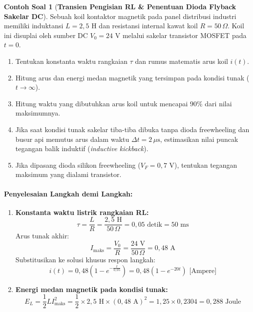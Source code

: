 \documentclass[11pt,a4paper]{article}
\theoremstyle{definition}
\newtheorem{example}{Contoh Soal}[section]
\begin{document}
\begin{example}[\textbf{Transien Pengisian RL \& Penentuan Dioda Flyback Sakelar DC}]
Sebuah koil kontaktor magnetik pada panel distribusi industri memiliki induktansi $L = 2{,}5\text{ H}$ dan resistansi internal kawat koil $R = 50\,\Omega$. Koil ini disuplai oleh sumber DC $V_0 = 24\text{ V}$ melalui sakelar transistor MOSFET pada $t = 0$.
\begin{enumerate}[label=(\alph*)]
    \item Tentukan konstanta waktu rangkaian $\tau$ dan rumus matematis arus koil $i(t)$.
    \item Hitung arus dan energi medan magnetik yang tersimpan pada kondisi tunak ($t \to \infty$).
    \item Hitung waktu yang dibutuhkan arus koil untuk mencapai $90\%$ dari nilai maksimumnya.
    \item Jika saat kondisi tunak sakelar tiba-tiba dibuka tanpa dioda freewheeling dan busur api memutus arus dalam waktu $\Delta t = 2\,\mu\text{s}$, estimasikan nilai puncak tegangan balik induktif (\textit{inductive kickback}).
    \item Jika dipasang dioda silikon freewheeling ($V_F = 0{,}7\text{ V}$), tentukan tegangan maksimum yang dialami transistor.
\end{enumerate}

\paragraph{Penyelesaian Langkah demi Langkah:}
\begin{enumerate}[label=(\alph*), leftmargin=*]
    \item \textbf{Konstanta waktu listrik rangkaian RL:}
    \begin{equation*}
        \tau = \frac{L}{R} = \frac{2{,}5\text{ H}}{50\,\Omega} = 0{,}05\text{ detik} = 50\text{ ms}
    \end{equation*}
    Arus tunak akhir:
    \begin{equation*}
        I_{\text{maks}} = \frac{V_0}{R} = \frac{24\text{ V}}{50\,\Omega} = 0{,}48\text{ A}
    \end{equation*}
    Substitusikan ke solusi khusus respon langkah:
    \begin{equation*}
        i(t) = 0{,}48 \left( 1 - e^{-\frac{t}{0{,}05}} \right) = 0{,}48 \left( 1 - e^{-20 t} \right)\text{ [Ampere]}
    \end{equation*}

    \item \textbf{Energi medan magnetik pada kondisi tunak:}
    \begin{equation*}
        E_L = \frac{1}{2} L I_{\text{maks}}^2 = \frac{1}{2} \times 2{,}5\text{ H} \times (0{,}48\text{ A})^2 = 1{,}25 \times 0{,}2304 = 0{,}288\text{ Joule}
    \end{equation*}


\end{enumerate}
\end{example}
\end{document}
